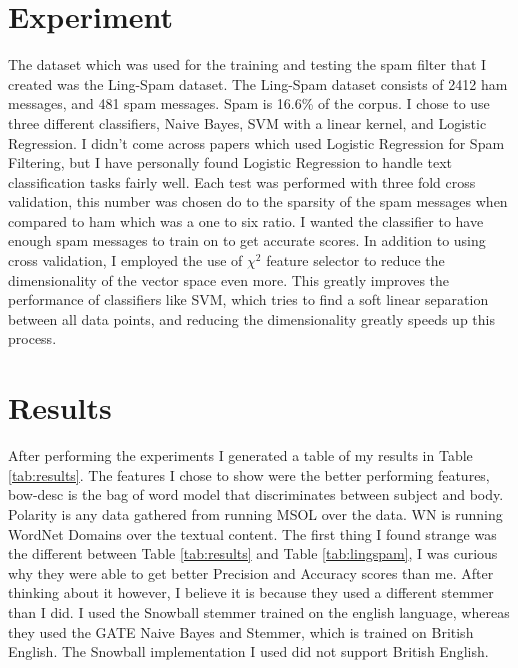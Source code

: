\documentclass[12pt]{amsart}
\begin{document}
\section{Experiment}

	The dataset which was used for the training and testing the spam filter that I created was the Ling-Spam dataset.  The Ling-Spam dataset consists of 2412 ham messages, and 481 spam messages.   Spam is 16.6\% of the corpus.  I chose to use three different classifiers, Naive Bayes, SVM with a linear kernel, and Logistic Regression.  I didn't come across papers which used Logistic Regression for Spam Filtering, but I have personally found Logistic Regression to handle text classification tasks fairly well.  	Each test was performed with three fold cross validation, this number was chosen do to the sparsity of the spam messages when compared to ham which was a one to six ratio.  I wanted the classifier to have enough spam messages to train on to get accurate scores. In addition to using cross validation, I employed the use of $\chi^2$ feature selector to reduce the dimensionality of the vector space even more.  This greatly improves the performance of classifiers like SVM, which tries to find a soft linear separation between all data points, and reducing the dimensionality greatly speeds up this process.


\section{Results}

After performing the experiments I generated a table of my results in Table \ref{tab:results}.  The features I chose to show were the better performing features, bow-desc is the bag of word model that discriminates between subject and body.  Polarity is any data gathered from running MSOL over the data. WN is running WordNet Domains over the textual content.  The first thing I found strange was the different between Table \ref{tab:results} and Table \ref{tab:lingspam}, I was curious why they were able to get better Precision and Accuracy scores than me.  After thinking about it however, I believe it is because they used a different stemmer than I did.  I used the Snowball stemmer trained on the english language, whereas they used the GATE Naive Bayes and Stemmer, which is trained on British English.  The Snowball implementation I used did not support British English.
\end{document}
